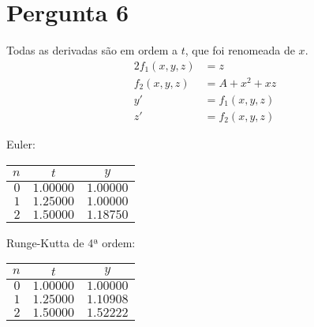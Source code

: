 {\section{Pergunta 6}
Todas as derivadas são em ordem a $t$, que foi renomeada de $x$.
\begin{alignat*}{2}
	f_1(x,y,z)&=z\\	
	f_2(x,y,z)&=A+x^2+xz\\	
	y'&=f_1(x,y,z)\\	
	z'&=f_2(x,y,z)
\end{alignat*}
%
\begin{center}
\begin{minipage}[c]{0.5\textwidth}
\begin{center} Euler:\\ \begin{tabular}{r | c c}
	$n$ & $t$ & $y$ \\ \hline
	$0$ & $1.00000$ & $1.00000$ \\
	$1$ & $1.25000$ & $1.00000$ \\
	$2$ & $1.50000$ & $1.18750$
\end{tabular} \end{center}
\end{minipage}%
\begin{minipage}[c]{0.5\textwidth}
\begin{center} Runge-Kutta de 4ª ordem:\\ \begin{tabular}{r | c c}
	$n$ & $t$ & $y$ \\ \hline
	$0$ & $1.00000$ & $1.00000$ \\
	$1$ & $1.25000$ & $1.10908$ \\
	$2$ & $1.50000$ & $1.52222$
\end{tabular} \end{center}
\end{minipage}
\end{center}
}